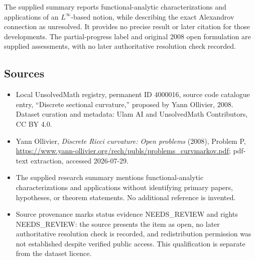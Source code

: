 \documentclass[11pt]{article}
\begin{document}
The supplied summary reports functional-analytic characterizations and applications of an $L^\infty$-based notion, while describing the exact Alexandrov connection as unresolved. It provides no precise result or later citation for those developments. The partial-progress label and original 2008 open formulation are supplied assessments, with no later authoritative resolution check recorded.
\subsection{Sources}
\begin{itemize}
\item Local UnsolvedMath registry, permanent ID 4000016, source code catalogue entry, ``Discrete sectional curvature,'' proposed by Yann Ollivier, 2008. Dataset curation and metadata: Ulam AI and UnsolvedMath Contributors, CC BY 4.0.
\item Yann Ollivier, \emph{Discrete Ricci curvature: Open problems} (2008), Problem P, \url{https://www.yann-ollivier.org/rech/publs/problems_curvmarkov.pdf}; pdf-text extraction, accessed 2026-07-29.
\item The supplied research summary mentions functional-analytic characterizations and applications without identifying primary papers, hypotheses, or theorem statements. No additional reference is invented.
\item Source provenance marks status evidence NEEDS\_REVIEW and rights NEEDS\_REVIEW: the source presents the item as open, no later authoritative resolution check is recorded, and redistribution permission was not established despite verified public access. This qualification is separate from the dataset licence.
\end{itemize}
\end{document}
